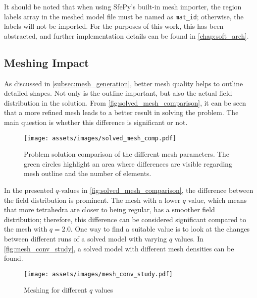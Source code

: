 It should be noted that when using SfePy's built-in mesh importer, the region labels array in the meshed model file must be named as \texttt{mat\_id}; otherwise, the labels will not be imported. For the purposes of this work, this has been abstracted, and further implementation details can be found in \autoref{chap:soft_arch}.

\subsection{Meshing Impact}
\label{sec:mesh_quality}

As discussed in \ref{subsec:mesh_generation}, better mesh quality helps to outline detailed shapes. Not only is the outline important, but also the actual field distribution in the solution. From \autoref{fig:solved_mesh_comparison}, it can be seen that a more refined mesh leads to a better result in solving the problem. The main question is whether this difference is significant or not.

\begin{figure}[H]
    \centering
    \texttt{[image: assets/images/solved\_mesh\_comp.pdf]}
    \caption[Problem solution comparison for the different $q$ mesh parameters.]{Problem solution comparison of the different mesh parameters. The green circles highlight an area where differences are visible regarding mesh outline and the number of elements.}
    \label{fig:solved_mesh_comparison}
\end{figure}

In the presented $q$-values in \autoref{fig:solved_mesh_comparison}, the difference between the field distribution is prominent. The mesh with a lower $q$ value, which means that more tetrahedra are closer to being regular, has a smoother field distribution; therefore, this difference can be considered significant compared to the mesh with $q=2.0$. One way to find a suitable value is to look at the changes between different runs of a solved model with varying $q$ values. In \autoref{fig:mesh_conv_study}, a solved model with different mesh densities can be found.

\begin{figure}[H]
    \centering
    \texttt{[image: assets/images/mesh\_conv\_study.pdf]}
    \caption{Meshing for different $q$ values}
    \label{fig:mesh_conv_study}
\end{figure}

